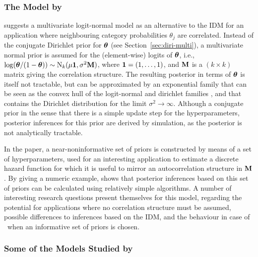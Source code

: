 \subsubsection{The Model by \texorpdfstring{\textcite{2009:bickis}}{Bickis (2009)}}
\label{sec:alternatives:bickis}

\textcite{2009:bickis} suggests a multivariate logit-normal model as an alternative to the IDM
for an application where neighbouring category probabilities $\theta_j$ are correlated.
Instead of the conjugate Dirichlet prior for $\boldsymbol{\theta}$ (see Section~\ref{sec:diri-multi}),
a multivariate normal prior is assumed for the (element-wise) logits of $\boldsymbol{\theta}$,
i.e., $\log(\boldsymbol{\theta}/(1-\boldsymbol{\theta})) \sim \operatorname{N}_k(\mu \mathbf{1}, \sigma^2\mathbf{M})$,
where $\mathbf{1} = (1, \ldots, 1)$, and $\mathbf{M}$ is a $(k\times k)$ matrix giving the correlation structure.
The resulting posterior in terms of $\boldsymbol{\theta}$ is itself not tractable, but can be approximated
by an exponential family that can be seen as the convex hull of the logit-normal
and dirichlet families \parencite[p.~189]{2009:bickis},
and that contains the Dirichlet distribution for the limit $\sigma^2 \to \infty$.
Although a conjugate prior in the sense that there is a simple update step for the hyperparameters,
posterior inferences for this prior are derived by simulation,
as the posterior is not analytically tractable.

In the paper, a near-noninformative set of priors is constructed
by means of a set of hyperparameters,
used for an interesting application to estimate a discrete hazard function
for which it is useful to mirror an autocorrelation structure in $\mathbf{M}$.
By giving a numeric example, \textcite{2009:bickis} shows that
posterior inferences based on this set of priors can be calculated using relatively simple algorithms.
A number of interesting research questions present themselves for this model,
regarding the potential for applications where no correlation structure must be assumed,
possible differences to inferences based on the IDM,
and the behaviour in case of \pdc\ when an informative set of priors is chosen.


\subsubsection{Some of the Models Studied by \texorpdfstring{\textcite{1991:pericchi}}{Pericchi and Walley (1991)}}
\label{sec:alternatives:pericchi}

